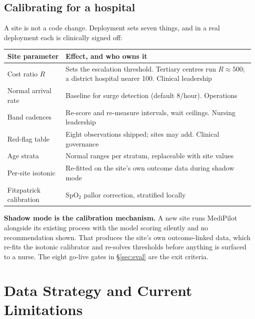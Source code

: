 \documentclass[10pt,a4paper,twocolumn]{article}
\begin{document}
\subsection{Calibrating for a hospital}
A site is not a code change. Deployment sets seven things, and in a real deployment each is
clinically signed off:

\begin{center}\footnotesize\sffamily
\begin{tabular}{@{}p{2.4cm}p{5.4cm}@{}}
\toprule
\rowcolor{AccPurple!10}
\textbf{Site parameter} & \textbf{Effect, and who owns it}\\
\midrule
Cost ratio $R$ & Sets the escalation threshold. Tertiary centres run $R\approx500$; a district
hospital nearer 100. Clinical leadership\\
\addlinespace[2pt]
Normal arrival rate & Baseline for surge detection (default 8/hour). Operations\\
\addlinespace[2pt]
Band cadences & Re-score and re-measure intervals, wait ceilings. Nursing leadership\\
\addlinespace[2pt]
Red-flag table & Eight observations shipped; sites may add. Clinical governance\\
\addlinespace[2pt]
Age strata & Normal ranges per stratum, replaceable with site values\\
\addlinespace[2pt]
Per-site isotonic & Re-fitted on the site's own outcome data during shadow mode\\
\addlinespace[2pt]
Fitzpatrick calibration & SpO$_2$ pallor correction, stratified locally\\
\bottomrule
\end{tabular}
\end{center}

\vspace{3pt}
\textbf{Shadow mode is the calibration mechanism.} A new site runs MediPilot alongside its existing
process with the model scoring silently and no recommendation shown. That produces the site's own
outcome-linked data, which re-fits the isotonic calibrator and re-solves thresholds before anything
is surfaced to a nurse. The eight go-live gates in \S\ref{sec:eval} are the exit criteria.

\section{Data Strategy and Current Limitations}
\label{sec:data}
\end{document}
